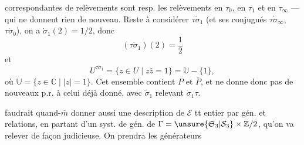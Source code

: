 correspondantes de relèvements  sont resp. les relèvements en $\tau_0$, en $\tau_1$ et en $\tau_\infty$ --- qui ne donnent rien de nouveau. Reste à considérer $\tau\dot\sigma_1$ (et ses conjugués  $\tau\dot\sigma_\infty$, $\tau\dot\sigma_0$), on a $\dot\sigma_1(2)=1/2$, donc
\[
(\tau\dot\sigma_1)(2)=\frac12
\]
et
\[
U^{\tau\dot\sigma_1}=\{z\in U\mid z\bar z=1\}=\mathbb U-\{1\},
\]
où $\mathbb U=\{z\in\mathbb C\mid|z|=1\}$. Cet ensemble contient $P$ et $\bar P$, et ne donne donc pas de nouveaux  p.r. à celui déjà donné, avec $\tilde\sigma_1$ relevant $\dot\sigma_1\tau$.

 faudrait quand-$\bar m$ donner aussi une description de $\mathcal E$ tt entier par gén. et relations, en partant d'un syst. de gén. de $\Gamma=\unsure{\mathfrak S_3|\mathcal S_3}\times\mathbb Z/2$, qu'on va relever de façon judicieuse. On prendra les  générateurs
